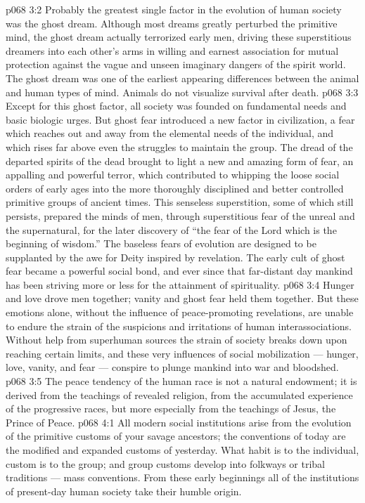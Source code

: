 \vs p068 3:2 Probably the greatest single factor in the evolution of human society was the ghost dream. Although most dreams greatly perturbed the primitive mind, the ghost dream actually terrorized early men, driving these superstitious dreamers into each other’s arms in willing and earnest association for mutual protection against the vague and unseen imaginary dangers of the spirit world. The ghost dream was one of the earliest appearing differences between the animal and human types of mind. Animals do not visualize survival after death.
\vs p068 3:3 Except for this ghost factor, all society was founded on fundamental needs and basic biologic urges. But ghost fear introduced a new factor in civilization, a fear which reaches out and away from the elemental needs of the individual, and which rises far above even the struggles to maintain the group. The dread of the departed spirits of the dead brought to light a new and amazing form of fear, an appalling and powerful terror, which contributed to whipping the loose social orders of early ages into the more thoroughly disciplined and better controlled primitive groups of ancient times. This senseless superstition, some of which still persists, prepared the minds of men, through superstitious fear of the unreal and the supernatural, for the later discovery of “the fear of the Lord which is the beginning of wisdom.” The baseless fears of evolution are designed to be supplanted by the awe for Deity inspired by revelation. The early cult of ghost fear became a powerful social bond, and ever since that far\hyp{}distant day mankind has been striving more or less for the attainment of spirituality.
\vs p068 3:4 \pc Hunger and love drove men together; vanity and ghost fear held them together. But these emotions alone, without the influence of peace\hyp{}promoting revelations, are unable to endure the strain of the suspicions and irritations of human interassociations. Without help from superhuman sources the strain of society breaks down upon reaching certain limits, and these very influences of social mobilization --- hunger, love, vanity, and fear --- conspire to plunge mankind into war and bloodshed.
\vs p068 3:5 The peace tendency of the human race is not a natural endowment; it is derived from the teachings of revealed religion, from the accumulated experience of the progressive races, but more especially from the teachings of Jesus, the Prince of Peace.
\vs p068 4:1 All modern social institutions arise from the evolution of the primitive customs of your savage ancestors; the conventions of today are the modified and expanded customs of yesterday. What habit is to the individual, custom is to the group; and group customs develop into folkways or tribal traditions --- mass conventions. From these early beginnings all of the institutions of present\hyp{}day human society take their humble origin.
